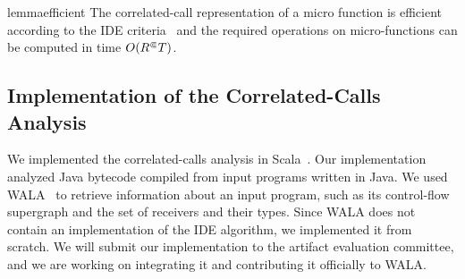 \begin{restatable}{lemma}{efficient}\label{lem:efficient}
  The correlated-call representation of a micro function is efficient according to the IDE criteria~\cite{sagiv1996precise} and the required operations
  on micro-functions can be computed in time $O({R^\Subset} T)$.
\end{restatable}


\subsection{Implementation of the Correlated-Calls Analysis}
We implemented the correlated-calls analysis in Scala~\cite{odersky2004overview}. 
Our implementation analyzed Java bytecode compiled from input programs written
in Java.
We used WALA~\cite{fink2012wala}
to retrieve information about an input program, such as its control-flow supergraph and the set of receivers and their types.
Since WALA does not contain an implementation of the IDE algorithm,
we implemented it from scratch.
We will submit our implementation to the artifact evaluation committee, and we are working on integrating it and contributing it officially to WALA. %

